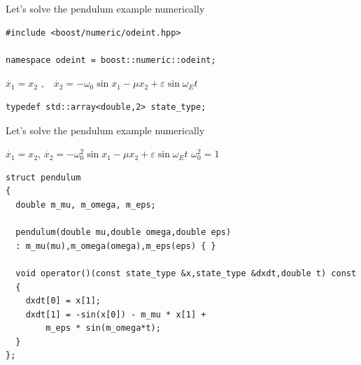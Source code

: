 






\begin{frame}[fragile]

\centerline{ \Large Let's solve the pendulum example numerically}

\vspace{2ex}
\begin{lstlisting}
#include <boost/numeric/odeint.hpp>

namespace odeint = boost::numeric::odeint;
\end{lstlisting}

\vspace{2ex}

\centerline{$\dot{x_1} = x_2 \,\,\text{,} \quad \dot{x_2} = - \omega_0 \sin x_1 - \mu x_2 + \varepsilon \sin \omega_E t$}

\vspace{2ex}
\begin{lstlisting}
typedef std::array<double,2> state_type;
\end{lstlisting}

\end{frame}

\begin{frame}[fragile]

\centerline{ \Large Let's solve the pendulum example numerically}

\vspace{2ex}

$\dot{x_1} = x_2$, $\dot{x_2} = - \omega_0^2 \sin x_1 - \mu x_2 + \varepsilon \sin \omega_E t$ \hspace{6ex} $\omega_0^2 = 1$

\vspace{2ex}

\begin{lstlisting}
struct pendulum
{
  double m_mu, m_omega, m_eps;

  pendulum(double mu,double omega,double eps)
  : m_mu(mu),m_omega(omega),m_eps(eps) { }

  void operator()(const state_type &x,state_type &dxdt,double t) const
  {
    dxdt[0] = x[1];
    dxdt[1] = -sin(x[0]) - m_mu * x[1] +
        m_eps * sin(m_omega*t);
  }
};
\end{lstlisting}

\end{frame}

